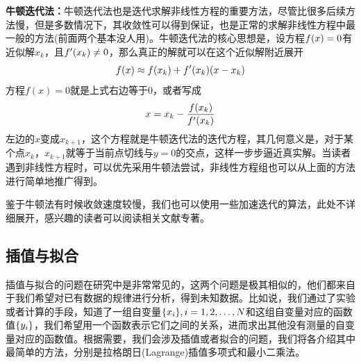 \documentclass[12pt,a4paper,openany,twoside]{book}
\numberwithin{equation}{section}
\begin{document}
            \textbf{牛顿迭代法：}牛顿迭代法也是迭代求解非线性方程的重要方法，尽管比很多后续方法慢，但是多数情况下，其收敛性可以得到保证，也是正常的求解非线性方程中最一般的方法(前面两个基本没人用)。牛顿迭代法的核心思想是，设方程$f\qty(x)=0$有近似解$x_k$，且$f'\qty(x_k)\neq0$，那么真正的解就可以在这个近似解附近展开
            \begin{equation*}
              f(x) \approx f\qty(x_k)+f'\qty(x_k)\qty(x-x_k)
            \end{equation*}
            方程$f(x)=0$就是上式右边等于0，或者写成
            \begin{equation*}
              x=x_k-\frac{f\qty(x_k)}{f'\qty(x_k)}
            \end{equation*}
            左边的$x$变成$x_{k+1}$，这个方程就是牛顿迭代法的迭代方程，其几何意义是，对于某个点$x_k$，$x_{k+1}$就等于当前点切线与$y=0$的交点，这样一步步逼近真实解。当读者遇到非线性方程时，可以优先采用牛顿法尝试，非线性方程组也可以从上面的方法进行简单地推广得到。

            鉴于牛顿法有时候收敛速度较慢，我们也可以使用一些加速迭代的算法，此处不详细展开，感兴趣的读者可以阅读相关文献专著。
          \subsection{插值与拟合}
            插值与拟合的问题在研究中是非常常见的，这两个问题是极其相似的，他们都来自于我们希望对已有数据的规律进行分析，得到未知数据。比如说，我们通过了实验或者计算的手段，知道了一组自变量$\qty{x_i},i=1,2,\dots,N$和这组自变量对应的函数值$\qty{y_i}$，我们希望用一个函数表示它们之间的关系，进而求出其他没有测量的自变量对应的函数值。根据需要，我们会涉及插值或者拟合的问题，我们将各介绍其中最简单的方法，分别是拉格朗日(Lagrange)插值多项式和最小二乘法。
\end{document}
